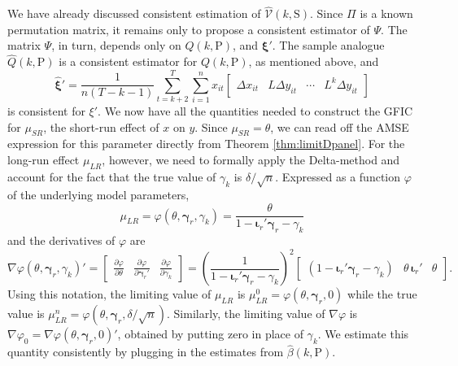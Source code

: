 We have already discussed consistent estimation of $\widehat{\mathcal{V}}(k,\text{S})$.
Since $\Pi$ is a known permutation matrix, it remains only to propose a consistent estimator of $\Psi$. 
The matrix $\Psi$, in turn, depends only on $Q(k,\text{P})$, and $\boldsymbol{\xi}'$.
The sample analogue $\widehat{Q}(k,\text{P})$ is a consistent estimator for $Q(k,\text{P})$, as mentioned above, and
\begin{equation}
  \widehat{\boldsymbol{\xi}}' = \frac{1}{n(T - k - 1)} \sum_{t = k+2}^T \sum_{i=1}^n x_{it}\left[
  \begin{array}{cccc}
    \Delta x_{it} & L \Delta y_{it} & \cdots & L^{k} \Delta y_{it} 
  \end{array}
\right]
\end{equation}
is consistent for $\xi'$.
We now have all the quantities needed to construct the GFIC for $\mu_{SR}$, the short-run effect of $x$ on $y$.
Since $\mu_{SR} = \theta$, we can read off the AMSE expression for this parameter directly from Theorem \ref{thm:limitDpanel}.
For the long-run effect $\mu_{LR}$, however, we need to formally apply the Delta-method and account for the fact that the true value of $\gamma_k$ is $\delta/\sqrt{n}$.
Expressed as a function $\varphi$ of the underlying model parameters, 
\[
  \mu_{LR} = \varphi(\theta, \boldsymbol{\gamma}_r, \gamma_k) = \frac{\theta}{1 - \boldsymbol{\iota}_r' \boldsymbol{\gamma}_r - \gamma_k}
\]
and the derivatives of $\varphi$ are
\[
  \nabla \varphi(\theta, \boldsymbol{\gamma}_r, \gamma_k)' = \left[
  \begin{array}{ccc}
    \displaystyle\frac{\partial \varphi}{\partial \theta} & 
    \displaystyle\frac{\partial \varphi}{\partial \boldsymbol{\gamma}_r'} &
    \displaystyle\frac{\partial \varphi}{\partial \gamma_k} 
  \end{array}
\right] = 
\left( \frac{1}{1 - \boldsymbol{\iota}_r' \boldsymbol{\gamma}_r - \gamma_k} \right)^2 \left[
\begin{array}{ccc}
  \left( 1 - \boldsymbol{\iota}_r' \boldsymbol{\gamma}_r - \gamma_k \right) & \theta \,\boldsymbol{\iota}_r' & \theta 
\end{array}
\right].
\]
Using this notation, the limiting value of $\mu_{LR}$ is $\mu_{LR}^{0} =  \varphi(\theta, \boldsymbol{\gamma}_r, 0)$
while the true value is
$\mu_{LR}^{n} = \varphi(\theta, \boldsymbol{\gamma}_r, \delta/\sqrt{n})$.
Similarly, the limiting value of $\nabla\varphi$ is $\nabla \varphi_0 = \nabla \varphi(\theta, \boldsymbol{\gamma}_r, 0)'$, obtained by putting zero in place of $\gamma_k$. 
We estimate this quantity consistently by plugging in the estimates from $\widehat{\beta}(k, \text{P})$.

